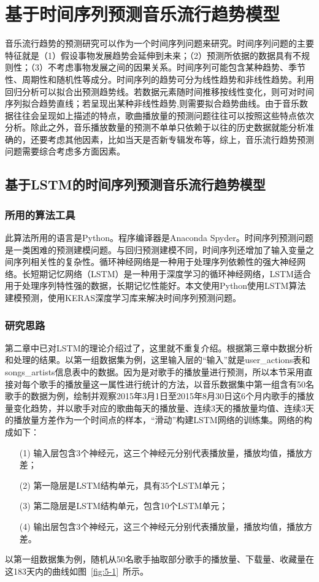 \chapter{基于时间序列预测音乐流行趋势模型}
音乐流行趋势的预测研究可以作为一个时间序列问题来研究。时间序列问题的主要特征就是（1）假设事物发展趋势会延伸到未来；（2）预测所依据的数据具有不规则性；（3）不考虑事物发展之间的因果关系。时间序列可能包含某种趋势、季节性、周期性和随机性等成分。时间序列的趋势可分为线性趋势和非线性趋势。利用回归分析可以拟合出预测趋势线。若数据元素随时间推移按线性变化，则可对时间序列拟合趋势直线；若呈现出某种非线性趋势,则需要拟合趋势曲线。由于音乐数据往往会呈现如上描述的特点，歌曲播放量的预测问题往往可以按照这些特点依次分析。除此之外，音乐播放数量的预测不单单只依赖于以往的历史数据就能分析准确的，还要考虑其他因素，比如当天是否新专辑发布等，综上，音乐流行趋势预测问题需要综合考虑多方面因素。
\section{基于LSTM的时间序列预测音乐流行趋势模型}
\subsection{所用的算法工具}
此算法所用的语言是Python。程序编译器是Anaconda Spyder。时间序列预测问题是一类困难的预测建模问题。与回归预测建模不同，时间序列还增加了输入变量之间序列相关性的复杂性。循环神经网络是一种用于处理序列依赖性的强大神经网络。长短期记忆网络（LSTM）是一种用于深度学习的循环神经网络，LSTM适合用于处理序列特性强的数据，长期记忆性能好。本文使用Python使用LSTM算法建模预测，使用KERAS深度学习库来解决时间序列预测问题。
\subsection{研究思路}
第二章中已对LSTM的理论介绍过了，这里就不重复介绍。根据第三章中数据分析和处理的结果。以第一组数据集为例，这里输入层的“输入”就是user\_actions表和songs\_artists信息表中的数据。因为是对歌手的播放量进行预测，所以本节采用直接对每个歌手的播放量这一属性进行统计的方法，以音乐数据集中第一组含有50名歌手的数据为例，绘制并观察2015年3月1日至2015年8月30日这6个月内歌手的播放量变化趋势，并以歌手对应的歌曲每天的播放量、连续3天的播放量均值、连续3天的播放量方差作为一个时间点的样本，“滑动”构建LSTM网络的训练集。网络的构成如下： 
\begin{itemize}
    \item[(1)] {输入层包含3个神经元，这三个神经元分别代表播放量，播放均值，播放方差； }
    \item[(2)] {第一隐层是LSTM结构单元，具有35个LSTM单元；}
    \item[(3)] {第二隐层是LSTM结构单元，包含10个LSTM单元；}
    \item[(4)] {输出层包含3个神经元，这三个神经元分别代表播放量，播放均值，播放方差。}
\end{itemize}
以第一组数据集为例，随机从50名歌手抽取部分歌手的播放量、下载量、收藏量在这183天内的曲线如图~\ref{fig:5-1}~所示。

